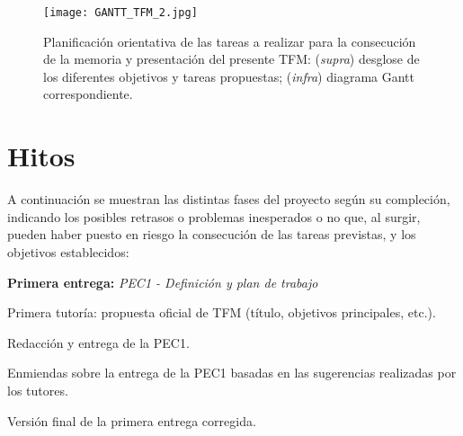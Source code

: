 \documentclass[IB,BIB]{TFUOC}%
\newcommand{\checkbox}{\text{\fboxsep=-.15pt\fbox{\rule{0pt}{1.5ex}\rule{1.5ex}{0pt}}}} %
\newcommand{\cmark}{\ding{51}} %
\newcommand{\xmark}{\ding{55}} %
\newcommand{\done}{\rlap{\checkbox}{\raisebox{1.2pt}{\large\hspace{1pt}\cmark}}
\hspace{-2.5pt}}
\newcommand{\wontfix}{\rlap{\checkbox}{\raisebox{-1.5pt}{\large\hspace{-.75pt}\xmark}}
\hspace{-2.5pt}}
\begin{document}
\begin{figure}[!htbp]
    \centering
    \texttt{[image: GANTT\_TFM\_2.jpg]}
    \caption{\scriptsize{Planificación orientativa de las tareas a realizar para la consecución de la memoria y presentación del presente TFM: (\textit{supra}) desglose de los diferentes objetivos y tareas propuestas; (\textit{infra}) diagrama Gantt correspondiente.}}
    \label{fig:GANTT_TFM}
\end{figure}


\newpage


\section{Hitos}
\label{sec:Hitos}

A continuación se muestran las distintas fases del proyecto según su compleción, indicando los posibles retrasos o problemas inesperados o no que, al surgir, pueden haber puesto en riesgo la consecución de las tareas previstas, y los objetivos establecidos:

\footnotesize


\begin{todolist}
  \item[\done] \textbf{Primera entrega:} \textit{PEC1 - Definición y plan de trabajo}
  \begin{todolist}
  \item[\done] Primera tutoría: propuesta oficial de TFM (título, objetivos principales, etc.).
  \item[\done] Redacción y entrega de la PEC1.
  \item[\done] Enmiendas sobre la entrega de la PEC1 basadas en las sugerencias realizadas por los tutores.
  \item[\done] Versión final de la primera entrega corregida.
  \end{todolist}
\end{todolist}
\end{document}

